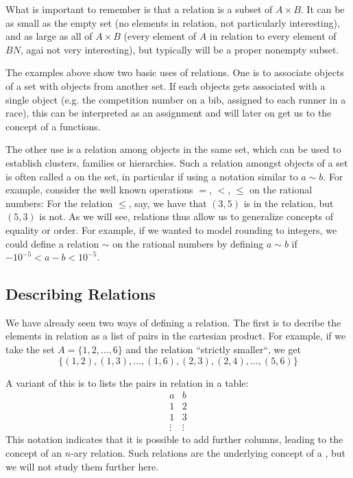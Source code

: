 What is important to remember is that a relation is a subset of $A\times B$.
It can be as small as the empty set (no elements in relation, not
particularly interesting), and as large as all of $A\times B$ (every element
of $A$ in relation to every element of $BN$, agai not very interesting),
but typically will be a proper nonempty subset.
\medskip

The examples above show two basic uses of relations. One is to associate objects
of a set with objects from another set. If each objects gets associated with
a single object (e.g. the competition number on a bib, assigned to each runner
in a race), this can be interpreted as an assignment and will later on get
us to the concept of a functions.

The other use is a relation among objects in the same set, which can be used
to establish clusters, families or hierarchies. Such a relation amongst
objects of a set is often called a  on the set, in
particular if using a notation similar to $a\sim b$.  For example, consider
the well known operations $=$, $<$, $\le$ on the rational numbers: For the
relation $\le$, say, we have that $(3,5)$ is in the relation, but $(5,3)$ is
not. As we will see, relations thus allow us to generalize concepts of
equality or order. For example, if we wanted to model rounding to integers,
we could define a relation $\sim$ on the rational numbers by
defining $a\sim b$ if $-10^{-5}<a-b<10^{-5}$.

\subsection{Describing Relations}
\label{descrel}

We have already seen two ways of defining a relation. The first is to
decribe the elements in relation as a list of pairs in the cartesian
product. For example, if we take the set $A=\{1,2,\ldots,6\}$ and the
relation ``strictly smaller``, we get
\[
\{(1,2),(1,3),\ldots,(1,6),(2,3),(2,4),\ldots,(5,6) \}
\]

A variant of this is to lists the pairs in relation in a table:
\[
\begin{array}{c|c}
a&b\\
\hline
1&2\\
1&3\\
\vdots&\vdots
\end{array} 
\]
This notation indicates that it is possible to add further columns, leading
to the concept of an $n$-ary relation. Such relations are the underlying
concept of a , but we will not study them
further here.
\smallskip

